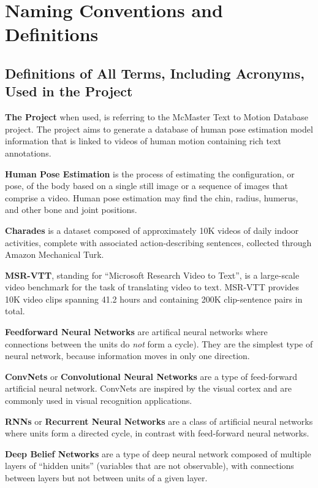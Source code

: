 \documentclass{scrreprt}
\begin{document}
\section{Naming Conventions and Definitions}

\subsection{Definitions of All Terms, Including Acronyms, Used in the Project}

\textbf{The Project} when used, is referring to the McMaster Text to Motion
Database project. The project aims to generate a database of human pose
estimation model information that is linked to videos of human motion
containing rich text annotations.

\textbf{Human Pose Estimation} is the process of estimating the configuration,
or pose, of the body based on a single still image or a sequence of images that
comprise a video. Human pose estimation may find the chin, radius, humerus, and
other bone and joint positions.

\textbf{Charades} is a dataset composed of approximately 10K videos of daily
indoor activities, complete with associated action-describing sentences,
collected through Amazon Mechanical Turk\cite{charades}.

\textbf{MSR-VTT}, standing for ``Microsoft Research Video to Text'', is a
large-scale video benchmark for the task of translating video to text. MSR-VTT
provides 10K video clips spanning 41.2 hours and containing 200K clip-sentence
pairs in total\cite{msr-vtt}.

\textbf{Feedforward Neural Networks} are artifical neural networks where
connections between the units do \textit{not} form a cycle). They are the
simplest type of neural network, because information moves in only one
direction.

\textbf{ConvNets} or \textbf{Convolutional Neural Networks} are a type of
feed-forward artificial neural network. ConvNets are inspired by the visual
cortex and are commonly used in visual recognition applications.

\textbf{RNNs} or \textbf{Recurrent Neural Networks} are a class of artificial
neural networks where units form a directed cycle, in contrast with
feed-forward neural networks.

\textbf{Deep Belief Networks} are a type of deep neural network composed of
multiple layers of ``hidden units'' (variables that are not observable), with
connections between layers but not between units of a given layer.
\end{document}
